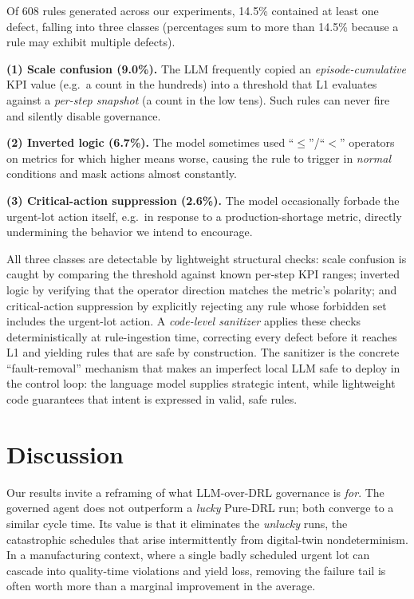 \documentclass[10pt]{article}
\begin{document}
Of 608 rules generated across our experiments,
14.5\% contained at least one defect, falling into three classes
(percentages sum to more than 14.5\% because a rule may exhibit multiple defects).

\noindent\textbf{(1) Scale confusion (9.0\%).} The LLM frequently copied an
\emph{episode-cumulative} KPI value (e.g.\ a count in the hundreds) into a
threshold that L1 evaluates against a \emph{per-step snapshot} (a count in the
low tens). Such rules can never fire and silently disable governance.

\noindent\textbf{(2) Inverted logic (6.7\%).} The model sometimes used
``$\leq$''/``$<$'' operators on metrics for which higher means worse, causing the
rule to trigger in \emph{normal} conditions and mask actions almost constantly.

\noindent\textbf{(3) Critical-action suppression (2.6\%).} The model
occasionally forbade the urgent-lot action itself, e.g.\ in
response to a production-shortage metric, directly undermining the behavior we
intend to encourage.

All three classes are detectable by lightweight structural checks: scale confusion
is caught by comparing the threshold against known per-step KPI ranges; inverted
logic by verifying that the operator direction matches the metric's polarity; and
critical-action suppression by explicitly rejecting any rule whose forbidden set
includes the urgent-lot action. A \emph{code-level sanitizer} applies these checks
deterministically at rule-ingestion time, correcting every defect before it
reaches L1 and yielding rules that are safe by construction. The sanitizer is
the concrete ``fault-removal'' mechanism that makes an imperfect local LLM safe
to deploy in the control loop: the language model supplies strategic intent,
while lightweight code guarantees that intent is expressed in valid, safe rules.


\section{Discussion}
\label{sec:discussion}

Our results invite a reframing of what LLM-over-DRL governance is \emph{for}. The
governed agent does not outperform a \emph{lucky} Pure-DRL run; both converge to a
similar cycle time. Its value is that it eliminates the \emph{unlucky} runs, the
catastrophic schedules that arise intermittently from digital-twin
nondeterminism. In a manufacturing context, where a single badly scheduled urgent
lot can cascade into quality-time violations and yield loss, removing the failure
tail is often worth more than a marginal improvement in the average.
\end{document}
